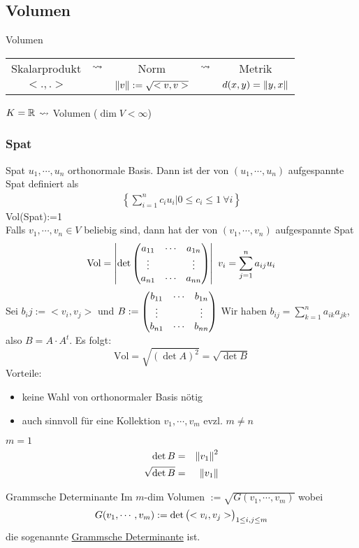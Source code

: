 \subsection{Volumen}
\begin{Def}{Volumen}
  \begin{tabular}{ccccc}
    Skalarprodukt & $\rightsquigarrow$ & Norm & $\rightsquigarrow$ &Metrik\\
    $<.,.>$ & & $\left\| v \right\|:=\sqrt{<v,v>}$ & & $d(x,y)=\left\| y,x \right\|$
  \end{tabular}
  $K=\mathbb{R}$ $\rightsquigarrow$ Volumen ($\dim V < \infty$)
\end{Def}
\subsubsection{Spat}
\begin{Def}{Spat}
  $u_1,\cdots,u_n$ orthonormale Basis. Dann ist der von $(u_1,\cdots,u_n)$ aufgespannte Spat definiert als
  \begin{align*}
    \left\{ \sum^n_{i=1}c_iu_i|0\leq c_i\leq 1\ \forall i \right\}
  \end{align*}
  Vol(Spat):=1\\
  Falls $v_1,\cdots,v_n\in V$ beliebig sind, dann hat der von $(v_1,\cdots,v_n)$ aufgespannte Spat
  \[\text{Vol} = \left| \det\begin{pmatrix}a_{11}&\cdots&a_{1n}\\ \vdots & & \vdots \\ a_{n1}&\cdots&a_{nn}\end{pmatrix} \right|\ v_i=\sum^n_{j=1}a_{ij}u_i\]
  Sei $b_ij:=<v_i,v_j>$ und $B:=\begin{pmatrix}b_{11}&\cdots&b_{1n}\\ \vdots & & \vdots \\ b_{n1}&\cdots&b_{nn}\end{pmatrix}$ Wir haben $b_{ij}=\sum^n_{k=1}a_{ik}a_{jk}$, also $B=A\cdot A^t$. Es folgt:
  \[\text{Vol}=\sqrt{(\det A)^2}=\sqrt{\det B}\]
  Vorteile:
  \begin{itemize}
    \item keine Wahl von orthonormaler Basis nötig
    \item auch sinnvoll für eine Kollektion $v_1,\cdots,v_m$ evzl. $m\neq n$
  \end{itemize}
\end{Def}
\begin{Bsp}{$m=1$}
  \begin{align*}
    \det B &=& \left\| v_1 \right\|^2\\
    \sqrt{\det B}&=& \left\| v_1 \right\|
  \end{align*}
\end{Bsp}
\begin{Def}{Grammsche Determinante}
  Im $m$-dim Volumen $:=\sqrt{G(v_1,\cdots,v_m)}$ wobei
  \[G(v_1,\cdots,v_m):=\det\begin{pmatrix}<v_i,v_j>\end{pmatrix}_{1\leq i,j\leq m}\]
  die sogenannte \underline{Grammsche Determinante} ist.
\end{Def}
